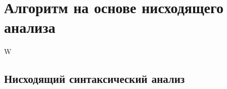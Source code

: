 \section{Алгоритм на основе нисходящего анализа}
W~\cite{Verbitskaia:2018:PCC:3241653.3241655}
\subsection{Нисходящий синтаксический анализ}

